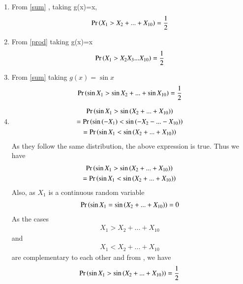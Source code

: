 \documentclass[journal,12pt,twocolumn]{IEEEtran}
\begin{document}
\begin{enumerate}[label = (\Alph*)]
    \item 
    From \eqref{sum} , taking g(x)=x,
    \begin{align}
        \Pr\left(X_1>X_2+...+X_{10}\right)=\frac{1}{2}
    \end{align}
\item
From \eqref{prod} taking g(x)=x
        \begin{align}
         \Pr\left(X_1>X_2X_3...X_{10}\right)=\frac{1}{2}   
        \end{align}
\item 
From \eqref{sum} taking $g(x)=\sin{x}$
        \begin{align}
         \Pr\left(\sin{X_1}>\sin{X_2}+...+\sin{X_{10}}\right)=\frac{1}{2}   
        \end{align}
\item \begin{multline}
        \Pr\left(\sin{X_1}>\sin{(X_2+...+X_{10})}\right)\\=\Pr\left(\sin{(-X_1)}<\sin{(-X_2-...-X_{10})}\right)\\
        =\Pr\left(\sin{X_1}<\sin{(X_2+...+X_{10})}\right)
    \end{multline}
    As they follow the same distribution, the above expression is true.
    Thus we have
    \begin{multline} 
    \Pr\left(\sin{X_1}>\sin{(X_2+...+X_{10}})\right)\\
        =\Pr\left(\sin{X_1}<\sin{(X_2+...+X_{10}})\right)    
    \end{multline}
    Also, as $X_1$ is a continuous random variable
    \begin{align}
       \Pr\left(\sin{X_1}=\sin{(X_2+...+X_{10})}\right)=0
    \end{align}
     As the cases
     \begin{align}
      {X_1>X_2+...+X_{10}}   
     \end{align}and 
     \begin{align}
         {X_1<X_2+...+X_{10}}
     \end{align}are complementary to each other and from   , we have 
        \begin{align}
         \Pr\left(\sin{X_1}>\sin{(X_2+...+X_{10}})\right)=\frac{1}{2}   
        \end{align}

\end{enumerate}
\end{document}
